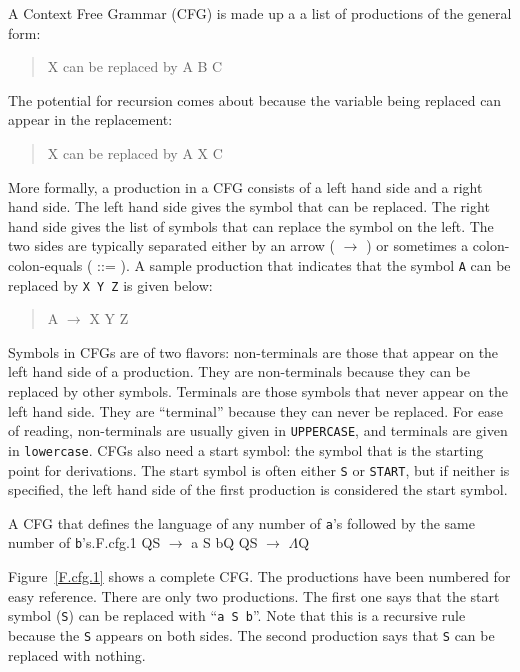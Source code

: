 \documentclass[letterpaper,12pt,openany,reqno]{book}%
\newcommand{\code}[1] {\lstinline[breaklines=yes,breakatwhitespace=yes]{#1}}
\newcommand{\cfgprod}[2] {{\ttfamily #1} $\rightarrow$ {\ttfamily #2}}
\newcommand{\cfgindentprod}[2] {\begin{quote} {\ttfamily #1} $\rightarrow$ {\ttfamily #2} \end{quote}}
\begin{document}
A Context Free Grammar (CFG) is made up a a list of productions of the general form:

\begin{quote}
X can be replaced by A B C
\end{quote}

The potential for recursion comes about because the variable being replaced can appear in the replacement:
\begin{quote}
X can be replaced by A X C
\end{quote}

More formally, a production in a CFG consists of a left hand side and a right hand side. The left hand side gives the symbol that can be replaced. The right hand side gives the list of symbols that can replace the symbol on the left. The two sides are typically separated 
either by an arrow ( $\rightarrow$ ) 
or sometimes a colon-colon-equals ( ::= ). 
A sample production that indicates that the symbol \code{A} 
can be replaced by \code{X Y Z} is given below:

\cfgindentprod{A}{X Y Z}

Symbols in CFGs are of two flavors: non-terminals are those that appear on the left hand side of a production. They are non-terminals because they can be replaced by other symbols. Terminals are those symbols that never appear on the left hand side. They are ``terminal'' because they can never be replaced. For ease of reading, non-terminals are usually given in \texttt{UPPERCASE}, and terminals are given in \texttt{lowercase}. CFGs also need a start symbol: the symbol that is the starting point for derivations. The start symbol is often either \code{S} or \code{START}, but if neither is specified, the left hand side of the first production is considered the start symbol.

\begin{cfg}{A CFG that defines the language of any number of \code{a}'s followed by the same number of \code{b}'s.}{F.cfg.1}
Q\cfgprod{S}{a S b}Q
Q\cfgprod{S}{$\Lambda$}Q
\end{cfg}

Figure~\ref{F.cfg.1} shows a complete CFG. The productions have been numbered for easy reference. There are only two productions. The first one says that the start symbol (\code{S}) can be replaced with ``\code{a S b}''. Note that this is a recursive rule because the \code{S} appears on both sides. The second production says that \code{S} can be replaced with nothing.
\end{document}
